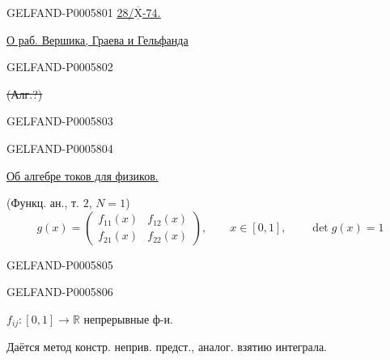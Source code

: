 \begin{GelfandAdjacentEvidence}{GELFAND-P000580}{1}
\underline{\underline{28/\(\overline{\underline{\mathrm X}}\)-74.}}
\qquad{}

\qquad\underline{О раб. Вершика, Граева и Гельфанда}
\end{GelfandAdjacentEvidence}
\begin{GelfandAdjacentEvidence}{GELFAND-P000580}{2}

\hspace{3em}\sout{(Алг.?)}\par
{}
\end{GelfandAdjacentEvidence}
\begin{GelfandAdjacentEvidence}{GELFAND-P000580}{3}

\end{GelfandAdjacentEvidence}
\begin{GelfandAdjacentEvidence}{GELFAND-P000580}{4}


\underline{Об алгебре токов для физиков.}

(Функц. ан., т. \(2\), \(N=1\))
\[
g(x)=\begin{pmatrix}
f_{11}(x)&f_{12}(x)\\
f_{21}(x)&f_{22}(x)
\end{pmatrix},\qquad x\in[0,1],\qquad \det g(x)=1
\]
\end{GelfandAdjacentEvidence}
\begin{GelfandAdjacentEvidence}{GELFAND-P000580}{5}

\end{GelfandAdjacentEvidence}
\begin{GelfandAdjacentEvidence}{GELFAND-P000580}{6}

\(f_{ij}\colon[0,1]\to\mathbb R\) непрерывные ф-и.

Даётся метод констр. неприв. предст., аналог. взятию интеграла.
\end{GelfandAdjacentEvidence}



